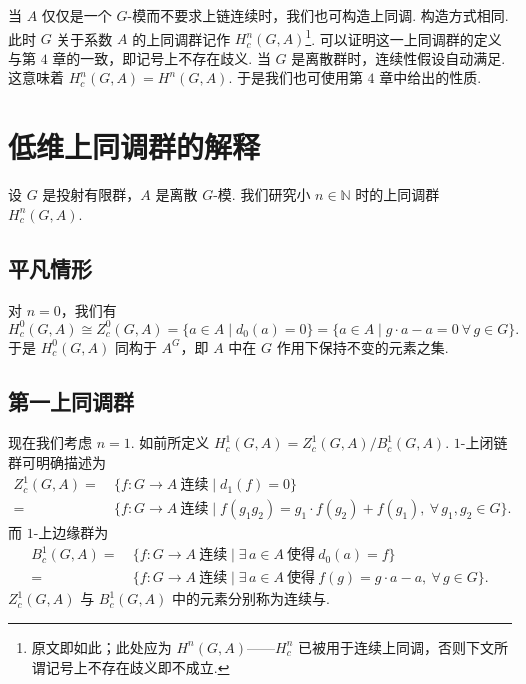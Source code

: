 \begin{remark}\label{c5-rem-1-8}
当 $A$ 仅仅是一个 $G$-模而不要求上链连续时，我们也可构造上同调. 构造方式相同. 此时 $G$ 关于系数 $A$ 的上同调群记作 $H^n_c(G,A)$\footnote{原文即如此；此处应为 $H^n(G,A)$——$H^n_c$ 已被用于连续上同调，否则下文所谓记号上不存在歧义即不成立.}. 可以证明这一上同调群的定义与第 $4$ 章的一致，即记号上不存在歧义. 当 $G$ 是离散群时，连续性假设自动满足. 这意味着 $H^n_c(G,A)=H^n(G,A)$. 于是我们也可使用第 $4$ 章中给出的性质.
\end{remark}

\section{低维上同调群的解释}

设 $G$ 是投射有限群，$A$ 是离散 $G$-模. 我们研究小 $n\in\mathbb{N}$ 时的上同调群 $H^n_c(G,A)$.

\subsection{平凡情形}
\label{c5-sub-2-1}

对 $n=0$，我们有
\[
H^0_c(G,A)\cong Z^0_c(G,A)=\{a\in A\mid d_0(a)=0\}=\{a\in A\mid g\cdot a-a=0\ \forall\, g\in G\}.
\]
于是 $H^0_c(G,A)$ 同构于 $A^G$，即 $A$ 中在 $G$ 作用下保持不变的元素之集.

\subsection{第一上同调群}
\label{c5-sub-2-2}

现在我们考虑 $n=1$. 如前所定义 $H^1_c(G,A)=Z^1_c(G,A)/B^1_c(G,A)$. $1$-上闭链群可明确描述为
\[
\begin{aligned}
Z^1_c(G,A)=\ &\{f:G\to A\ \text{连续}\mid d_1(f)=0\}\\
=\ &\{f:G\to A\ \text{连续}\mid f(g_1g_2)=g_1\cdot f(g_2)+f(g_1),\ \forall\, g_1,g_2\in G\}.
\end{aligned}
\]
而 $1$-上边缘群为
\[
\begin{aligned}
B^1_c(G,A)=\ &\{f:G\to A\ \text{连续}\mid \exists\, a\in A\ \text{使得}\ d_0(a)=f\}\\
=\ &\{f:G\to A\ \text{连续}\mid \exists\, a\in A\ \text{使得}\ f(g)=g\cdot a-a,\ \forall\, g\in G\}.
\end{aligned}
\]
$Z^1_c(G,A)$ 与 $B^1_c(G,A)$ 中的元素分别称为连续与.


